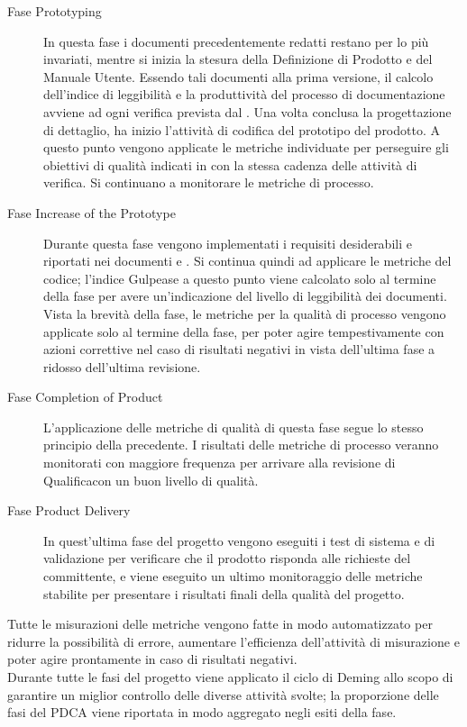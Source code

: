 \begin{description}
		\item[Fase Prototyping] In questa fase i documenti precedentemente redatti restano per lo più invariati, mentre si inizia la stesura della Definizione di Prodotto e del Manuale Utente. Essendo tali documenti alla prima versione, il calcolo dell'indice di leggibilità e la produttività del processo di documentazione avviene ad ogni verifica prevista dal . Una volta conclusa la progettazione di dettaglio, ha inizio l'attività di codifica del prototipo del prodotto. A questo punto vengono applicate le metriche individuate per perseguire gli obiettivi di qualità indicati in  con la stessa cadenza delle attività di verifica. Si continuano a monitorare le metriche di processo.
		\item[Fase Increase of the Prototype] Durante questa fase vengono implementati i requisiti desiderabili e riportati nei documenti  e . Si continua quindi ad applicare le metriche del codice; l'indice  Gulpease a questo punto viene calcolato solo al termine della fase per avere un'indicazione del livello di leggibilità dei documenti. Vista la brevità della fase, le metriche per la qualità di processo vengono applicate solo al termine della fase, per poter agire tempestivamente con azioni correttive nel caso di risultati negativi in vista dell'ultima fase a ridosso dell'ultima revisione.
		\item[Fase Completion of Product] L'applicazione delle metriche di qualità di questa fase segue lo stesso principio della precedente. I risultati delle metriche di processo veranno monitorati con maggiore frequenza per arrivare alla revisione di Qualificacon un buon livello di qualità.
		\item[Fase Product Delivery] In quest'ultima fase del progetto vengono eseguiti i test di sistema e di validazione per verificare che il prodotto risponda alle richieste del committente, e viene eseguito un ultimo monitoraggio delle metriche stabilite per presentare i risultati finali della qualità del progetto.
		\end{description}
		Tutte le misurazioni delle metriche vengono fatte in modo automatizzato per ridurre la possibilità di errore, aumentare l'efficienza dell'attività di misurazione e poter agire prontamente in caso di risultati negativi.\\
		Durante tutte le fasi del progetto viene applicato il ciclo di Deming allo scopo di garantire un miglior controllo delle diverse attività svolte; la proporzione delle fasi del PDCA viene riportata in modo aggregato negli esiti della fase.

